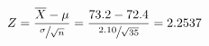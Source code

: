 \begin{equation*}
    Z=\frac{\overline{X}-\mu}{\sfrac{\sigma}{\sqrt{n}}}
    =\frac{73.2-72.4}{\sfrac{2.10}{\sqrt{35}}}=2.2537
    \end{equation*}